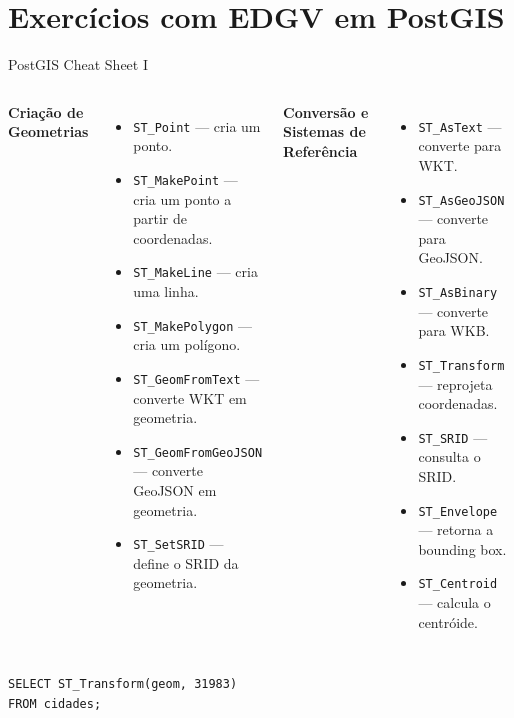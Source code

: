 \documentclass{beamer}
\begin{document}
\section{Exercícios com EDGV em PostGIS}
\begin{frame}[fragile]{PostGIS Cheat Sheet I}

\scriptsize

\begin{columns}[t]


\textbf{Criação de Geometrias}

\begin{itemize}
    \item \texttt{ST\_Point} --- cria um ponto.
    \item \texttt{ST\_MakePoint} --- cria um ponto a partir de coordenadas.
    \item \texttt{ST\_MakeLine} --- cria uma linha.
    \item \texttt{ST\_MakePolygon} --- cria um polígono.
    \item \texttt{ST\_GeomFromText} --- converte WKT em geometria.
    \item \texttt{ST\_GeomFromGeoJSON} --- converte GeoJSON em geometria.
    \item \texttt{ST\_SetSRID} --- define o SRID da geometria.
\end{itemize}


\textbf{Conversão e Sistemas de Referência}

\begin{itemize}
    \item \texttt{ST\_AsText} --- converte para WKT.
    \item \texttt{ST\_AsGeoJSON} --- converte para GeoJSON.
    \item \texttt{ST\_AsBinary} --- converte para WKB.
    \item \texttt{ST\_Transform} --- reprojeta coordenadas.
    \item \texttt{ST\_SRID} --- consulta o SRID.
    \item \texttt{ST\_Envelope} --- retorna a bounding box.
    \item \texttt{ST\_Centroid} --- calcula o centróide.
\end{itemize}

\end{columns}

\vspace{0.3cm}

\begin{verbatim}
SELECT ST_Transform(geom, 31983)
FROM cidades;
\end{verbatim}

\end{frame}
\end{document}
